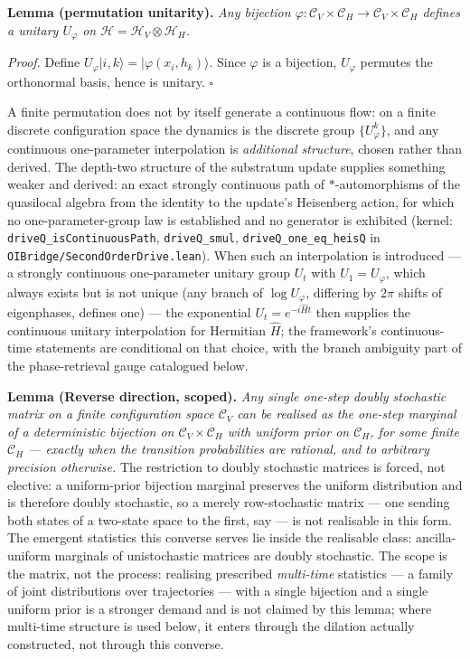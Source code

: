 \documentclass[
]{article}
\begin{document}
\textbf{Lemma (permutation unitarity).} \emph{Any bijection
\(\varphi: \mathcal{C}_V \times \mathcal{C}_H \to \mathcal{C}_V \times \mathcal{C}_H\)
defines a unitary \(U_\varphi\) on
\(\mathcal{H} = \mathcal{H}_V \otimes \mathcal{H}_H\).}

\emph{Proof.} Define
\(U_\varphi |i, k\rangle = |\varphi(x_i, h_k)\rangle\). Since
\(\varphi\) is a bijection, \(U_\varphi\) permutes the orthonormal
basis, hence is unitary. \(\square\)

A finite permutation does not by itself generate a continuous flow: on a
finite discrete configuration space the dynamics is the discrete group
\(\{U_\varphi^k\}\), and any continuous one-parameter interpolation is
\emph{additional structure}, chosen rather than derived. The depth-two
structure of the substratum update supplies something weaker and
derived: an exact strongly continuous path of \(*\)-automorphisms of the
quasilocal algebra from the identity to the update's Heisenberg action,
for which no one-parameter-group law is established and no generator is
exhibited (kernel: \texttt{driveQ\_isContinuousPath},
\texttt{driveQ\_smul}, \texttt{driveQ\_one\_eq\_heisQ} in
\texttt{OIBridge/SecondOrderDrive.lean}). When such an interpolation is
introduced --- a strongly continuous one-parameter unitary group \(U_t\)
with \(U_1 = U_\varphi\), which always exists but is not unique (any
branch of \(\log U_\varphi\), differing by \(2\pi\) shifts of
eigenphases, defines one) --- the exponential \(U_t = e^{-i\hat{H}t}\)
then supplies the continuous unitary interpolation for Hermitian
\(\hat{H}\); the framework's continuous-time statements are conditional
on that choice, with the branch ambiguity part of the phase-retrieval
gauge catalogued below.

\textbf{Lemma (Reverse direction, scoped).} \emph{Any single one-step
doubly stochastic matrix on a finite configuration space
\(\mathcal{C}_V\) can be realised as the one-step marginal of a
deterministic bijection on \(\mathcal{C}_V \times \mathcal{C}_H\) with
uniform prior on \(\mathcal{C}_H\), for some finite \(\mathcal{C}_H\)
--- exactly when the transition probabilities are rational, and to
arbitrary precision otherwise.} The restriction to doubly stochastic
matrices is forced, not elective: a uniform-prior bijection marginal
preserves the uniform distribution and is therefore doubly stochastic,
so a merely row-stochastic matrix --- one sending both states of a
two-state space to the first, say --- is not realisable in this form.
The emergent statistics this converse serves lie inside the realisable
class: ancilla-uniform marginals of unistochastic matrices are doubly
stochastic. The scope is the matrix, not the process: realising
prescribed \emph{multi-time} statistics --- a family of joint
distributions over trajectories --- with a single bijection and a single
uniform prior is a stronger demand and is not claimed by this lemma;
where multi-time structure is used below, it enters through the dilation
actually constructed, not through this converse.
\end{document}
